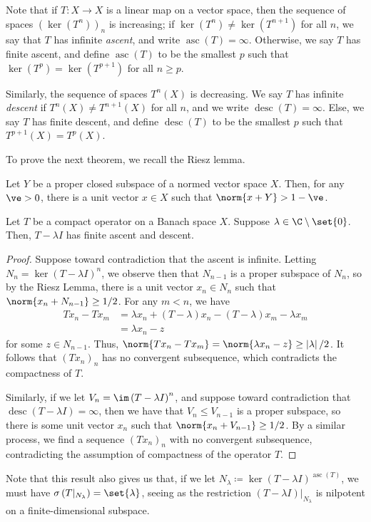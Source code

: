 \documentclass[10pt]{mypackage}
\begin{document}
Note that if $T\colon X\rightarrow X$ is a linear map on a vector space, then the sequence of spaces $\left( \ker\left( T^n \right) \right)_{n}$ is increasing; if $\ker\left( T^n \right) \neq \ker\left( T^{n+1} \right)$ for all $n$, we say that $T$ has infinite \textit{ascent}, and write $\operatorname{asc}\left( T \right) = \infty$. Otherwise, we say $T$ has finite ascent, and define $\operatorname{asc}(T)$ to be the smallest $p$ such that $\ker\left( T^p \right) = \ker\left( T^{p+1} \right)$ for all $n \geq p$.

Similarly, the sequence of spaces $T^{n}(X)$ is decreasing. We say $T$ has infinite \textit{descent} if $T^{n}(X)\neq T^{n+1}(X)$ for all $n$, and we write $\operatorname{desc}(T) = \infty$. Else, we say $T$ has finite descent, and define $\operatorname{desc}(T)$ to be the smallest $p$ such that $T^{p+1}(X) = T^{p}(X)$.

To prove the next theorem, we recall the Riesz lemma.
\begin{lemma}
  Let $Y$ be a proper closed subspace of a normed vector space $X$. Then, for any $\ve > 0$, there is a unit vector $x\in X$ such that $\norm{x + Y} > 1-\ve$.
\end{lemma}
\begin{theorem}
  Let $T$ be a compact operator on a Banach space $X$. Suppose $\lambda\in \C\setminus \set{0}$. Then, $T- \lambda I$ has finite ascent and descent.
\end{theorem}
\begin{proof}
  Suppose toward contradiction that the ascent is infinite. Letting $N_n = \ker\left( T-\lambda I \right)^{n}$, we observe then that $N_{n-1}$ is a proper subspace of $N_n$, so by the Riesz Lemma, there is a unit vector $x_n\in N_n$ such that $\norm{x_n + N_{n-1}} \geq 1/2$. For any $m < n$, we have
  \begin{align*}
    Tx_n - Tx_m &= \lambda x_n + \left( T-\lambda \right)x_n - \left( T-\lambda \right)x_m - \lambda x_m\\
                &= \lambda x_n - z
  \end{align*}
  for some $z\in N_{n-1}$. Thus, $\norm{Tx_n - Tx_m} = \norm{\lambda x_n - z} \geq \left\vert \lambda \right\vert/2$. It follows that $\left( Tx_n \right)_n$ has no convergent subsequence, which contradicts the compactness of $T$.

  Similarly, if we let $V_n = \im\left( T-\lambda I \right)^{n}$, and suppose toward contradiction that $\operatorname{desc}\left( T-\lambda I \right) = \infty$, then we have that $V_{n}\leq V_{n-1}$ is a proper subspace, so there is some unit vector $x_n$ such that $\norm{x_n + V_{n-1}}\geq 1/2$. By a similar process, we find a sequence $\left( Tx_n \right)_n$ with no convergent subsequence, contradicting the assumption of compactness of the operator $T$.
\end{proof}
Note that this result also gives us that, if we let $N_{\lambda}\coloneq \ker\left( T - \lambda I \right)^{\operatorname{asc}(T)}$, we must have $\sigma\left( T|_{N_{\lambda}} \right) = \set{\lambda}$, seeing as the restriction $\left( T-\lambda I \right)|_{N_{\lambda}}$ is nilpotent on a finite-dimensional subspace.
\end{document}
